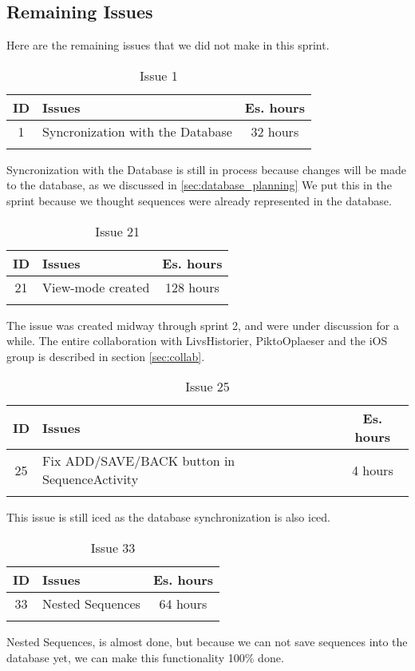 \subsection{Remaining Issues}
\label{subsec:spr2_RemainingIssues}
Here are the remaining issues that we did not make in this sprint.

\begin{longtable} { | c | p{12cm} | c | } 
\hline
	ID 	&	Issues	&		 Es. hours \\\hline
	1	&	Syncronization with the Database 	&	32 hours	\\\hline
\caption{Issue 1}
\label{tab:spr2_syncwithdatabase}
\end{longtable}

Syncronization with the Database is still in process because changes will be made to the database, as we discussed in \ref{sec:database_planning} We put this in the sprint because we thought sequences were already represented in the database.


\begin{longtable} { | c | p{12cm} | c | } 
\hline
	ID 	&	Issues	&		 Es. hours \\\hline
	21	&	View-mode created 	&	128 hours	\\\hline
\caption{Issue 21}
\label{tab:spr2_viewmodecreated}
\end{longtable}

The issue was created midway through sprint 2, and were under discussion for a while. The entire collaboration with LivsHistorier, PiktoOplaeser and the iOS group is described in section \ref{sec:collab}.\\

\begin{longtable} { | c | p{12cm} | c | } 
\hline
	ID 	&	Issues	&		 Es. hours \\\hline
	25	&	Fix ADD/SAVE/BACK button in SequenceActivity 	&	4 hours	\\\hline
\caption{Issue 25}
\label{tab:spr2_addsavebackbuttons}
\end{longtable}

This issue is still iced as the database synchronization is also iced.

\begin{longtable} { | c | p{12cm} | c | } 
\hline
	ID 	&	Issues	&		 Es. hours \\\hline
	33	&	Nested Sequences 	&	64 hours	\\\hline
\caption{Issue 33}
\label{tab:spr2_nestedsequences}
\end{longtable}

Nested Sequences, is almost done, but because we can not save sequences into the database yet, we can make this functionality 100\% done.\\
